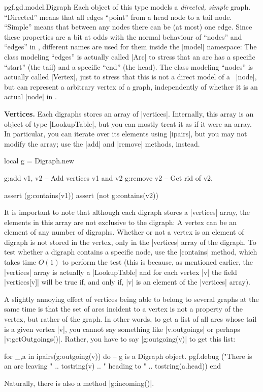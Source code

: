 \begin{luaclass}{pgf.gd.model.}{Digraph}
  Each object of this type models a \emph{directed, simple}
  graph. ``Directed'' means that all edges ``point'' from a head node
  to a tail node. ``Simple'' means that between any nodes there can be
  (at most) one edge. Since these properties are a bit at odds with
  the normal behaviour of ``nodes'' and ``edges'' in \tikzname,
  different names are used for them inside the |model| namespace:
  The class modeling  ``edges'' is actually called |Arc| to stress
  that an arc has a specific ``start'' (the tail) and a specific
  ``end'' (the head). The class modeling ``nodes'' is actually called
  |Vertex|, just to stress that this is not a direct model of a
  \tikzname\ |node|, but can represent a arbitrary vertex of a graph,
  independently of whether it is an actual |node| in \tikzname.
  
  \medskip
  \noindent\textbf{Vertices.}
  Each digraphs stores an array of |vertices|. Internally, this array
  is an object of type |LookupTable|, but you can mostly treat it as
  if it were an array. In particular, you can iterate over its
  elements using |ipairs|, but you may not modify the array; use the
  |add| and |remove| methods, instead.

\begin{codeexample}
local g = Digraph.new {}

g:add { v1, v2 } -- Add vertices v1 and v2
g:remove { v2 }  -- Get rid of v2.

assert (g:contains(v1))
assert (not g:contains(v2))
\end{codeexample}

  It is important to note that although each digraph stores a
  |vertices| array, the elements in this array are not exclusive to
  the digraph: A vertex can be an element of any number of
  digraphs. Whether or not a vertex is an element of digraph is not
  stored in the vertex, only in the |vertices| array of the
  digraph. To test whether a digraph contains a specific node, use the
  |contains| method, which takes time $O(1)$ to perform the test (this
  is because, as mentioned earlier, the |vertices| array is actually a
  |LookupTable| and for each vertex |v| the field |vertices[v]| will
  be true if, and only if, |v| is an element of the |vertices| array).

  A slightly annoying effect of vertices being able to belong to
  several graphs at the same time is that the set of arcs incident to
  a vertex is not a property of the vertex, but rather of the
  graph. In other words, to get a list of all arcs whose tail is a
  given vertex |v|, you cannot say something like |v.outgoings| or
  perhaps |v:getOutgoings()|. Rather, you have to say |g:outgoing(v)|
  to get this list:
\begin{codeexample}
for _,a in ipairs(g:outgoing(v)) do  -- g is a Digraph object.    
  pgf.debug ("There is an arc leaving " .. tostring(v) ..
             " heading to " .. tostring(a.head))
end
\end{codeexample}
  Naturally, there is also a method |g:incoming()|.


\end{luaclass}

